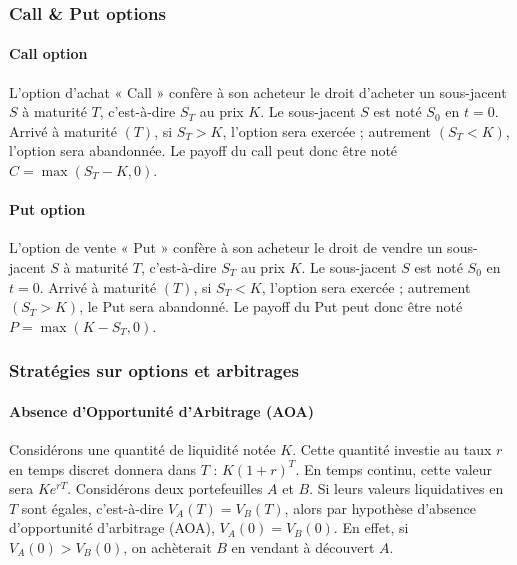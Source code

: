 \documentclass[a4paper, 12pt]{report}
\begin{document}
\subsubsection{Call \& Put options}

\paragraph{Call option}

L’option d’achat « Call » confère à son acheteur le droit d’acheter un sous-jacent \( S \) à maturité \( T \), c’est-à-dire \( S_T \) au prix \( K \). Le sous-jacent \( S \) est noté \( S_0 \) en \( t = 0 \). Arrivé à maturité \( (T) \), si \( S_T > K \), l’option sera exercée ; autrement \( (S_T < K) \), l’option sera abandonnée. Le payoff du call peut donc être noté \( C = \max(S_T - K, 0) \).

\paragraph{Put option}

L’option de vente « Put » confère à son acheteur le droit de vendre un sous-jacent \( S \) à maturité \( T \), c’est-à-dire \( S_T \) au prix \( K \). Le sous-jacent \( S \) est noté \( S_0 \) en \( t = 0 \). Arrivé à maturité \( (T) \), si \( S_T < K \), l’option sera exercée ; autrement \( (S_T > K) \), le Put sera abandonné. Le payoff du Put peut donc être noté \( P = \max(K - S_T, 0) \).

\subsubsection{Stratégies sur options et arbitrages}

\paragraph{Absence d’Opportunité d’Arbitrage (AOA)}

Considérons une quantité de liquidité notée \( K \). Cette quantité investie au taux \( r \) en temps discret donnera dans \( T \) : \( K (1 + r)^T \). En temps continu, cette valeur sera \( Ke^{rT} \). Considérons deux portefeuilles \( A \) et \( B \). Si leurs valeurs liquidatives en \( T \) sont égales, c’est-à-dire \( V_A(T) = V_B(T) \), alors par hypothèse d’absence d’opportunité d’arbitrage (AOA), \( V_A(0) = V_B(0) \). En effet, si \( V_A(0) > V_B(0) \), on achèterait \( B \) en vendant à découvert \( A \).
\end{document}
